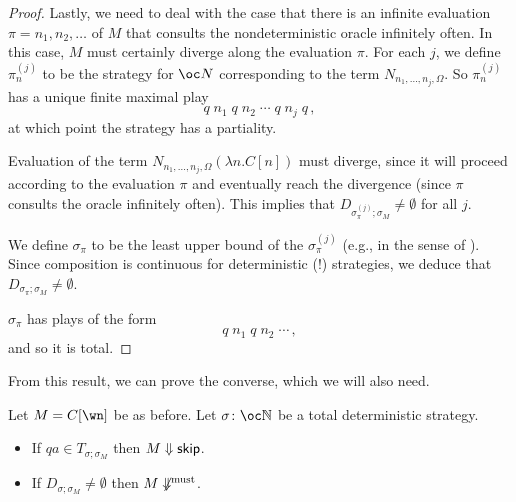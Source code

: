 \documentclass[sigplan,10pt,review]{acmart}\settopmatter{printfolios=true,printccs=false,printacmref=false}
\begin{document}
\begin{proof}
  Lastly, we need to deal with the case that there is an infinite evaluation $\pi = n_1,n_2,\dots$ of $M$ that consults the nondeterministic oracle infinitely often.
  In this case, $M$ must certainly diverge along the evaluation $\pi$.
  For each $j$, we define $\pi_n^{(j)}$ to be the strategy for $\oc N$ corresponding to the term $N_{n_1,\dots,n_j,\Omega}$.  
  So $\pi_n^{(j)}$ has a unique finite maximal play
  \[
    q\;n_1\;q\;n_2\;\cdots\;q\;n_j\;q\,,
    \]
  at which point the strategy has a partiality.  

  Evaluation of the term $N_{n_1,\dots,n_j,\Omega} (\lambda n.C[n])$ must diverge, since it will proceed according to the evaluation $\pi$ and eventually reach the divergence (since $\pi$ consults the oracle infinitely often).  
  This implies that $D_{\sigma_\pi^{(j)};\sigma_M}\ne\emptyset$ for all $j$.

  We define $\sigma_\pi$ to be the least upper bound of the $\sigma_\pi^{(j)}$ (e.g., in the sense of \cite{mcCHFiniteND}).  
  Since composition is continuous for deterministic (!) strategies, we deduce that $D_{\sigma_\pi;\sigma_M}\ne\emptyset$.

  $\sigma_\pi$ has plays of the form
  \[
    q\;n_1\;q\;n_2\;\cdots\,,
    \]
  and so it is total.
\end{proof}

From this result, we can prove the converse, which we will also need.

\begin{lemma}
  Let $M=C[\wn]$ be as before.
  Let $\sigma\from\oc\bN$ be a total deterministic strategy.
  \begin{itemize}
    \item If $qa\in T_{\sigma;\sigma_M}$ then $M\Downarrow{\mathsf{skip}}$.
    \item If $D_{\sigma;\sigma_M}\ne\emptyset$ then $M\not\Downarrow^{\text{must}}$.
  \end{itemize}
  \label{lem:soundness-converse}
\end{lemma}
\end{document}

